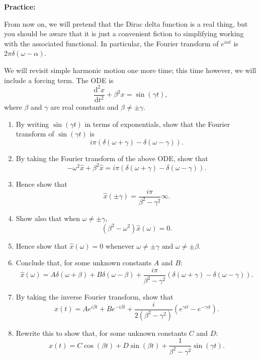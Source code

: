 \documentclass{article}
\newcommand{\deriv}[3][]{\frac{\mathrm{d}^{#1}#2}{\mathrm{d}#3^{#1}}}
\begin{document}
\clearpage



\textbf{Practice:}\bigskip

From now on, we will pretend that the Dirac delta function is a real thing, but you should be aware that it is just a convenient fiction to simplifying working with the associated functional. In particular, the Fourier transform of $e^{i\alpha t}$ is $2\pi\delta(\omega-\alpha)$.\bigskip

We will revisit simple harmonic motion one more time; this time however, we will include a forcing term. The ODE is
\[\deriv[2]{x}{t}+\beta^2x=\sin(\gamma t),\]
where $\beta$ and $\gamma$ are real constants and $\beta\neq \pm\gamma$.

\begin{enumerate}
	\item By writing $\sin(\gamma t)$ in terms of exponentials, show that the Fourier transform of $\sin(\gamma t)$ is
		\[i\pi\left(\delta(\omega+\gamma)-\delta(\omega-\gamma)\right).\]
	\item By taking the Fourier transform of the above ODE, show that
		\[-\omega^2\hat{x}+\beta^2\hat{x}=i\pi\left(\delta(\omega+\gamma)-\delta(\omega-\gamma)\right).\]
	\item Hence show that
		\[\hat{x}\left(\pm\gamma\right) = \frac{i\pi}{\beta^2 -\gamma^2}\infty.\]
	\item Show also that when $\omega\neq \pm \gamma$,
		\[\left(\beta^2-\omega^2 \right)\hat{x}(\omega)=0.\]
	\item Hence show that $\hat{x}(\omega)=0$ whenever $\omega\neq\pm\gamma \mbox{ and } \omega\neq \pm\beta$.
	\item Conclude that, for some unknown constants $A$ and $B$:
		\[\hat{x}(\omega)=A\delta\left(\omega+\beta\right)+B\delta\left(\omega-\beta\right)+ \frac{i\pi}{\beta^2 -\gamma^2}\left(\delta(\omega+\gamma)- \delta(\omega-\gamma)\right).\]
	\item By taking the inverse Fourier transform, show that
		\[x(t)=Ae^{ i\beta t}+Be^{-i\beta t}+\frac{i}{2\left(\beta^2-\gamma^2\right)}\left(e^{\gamma it}-e^{-\gamma it}\right).\]
	\item Rewrite this to show that, for some unknown constants $C$ and $D$:
		\[x(t)=C\cos(\beta t) + D\sin(\beta t) + \frac{1}{\beta^2-\gamma^2}\sin(\gamma t).\]
\end{enumerate}
\end{document}

